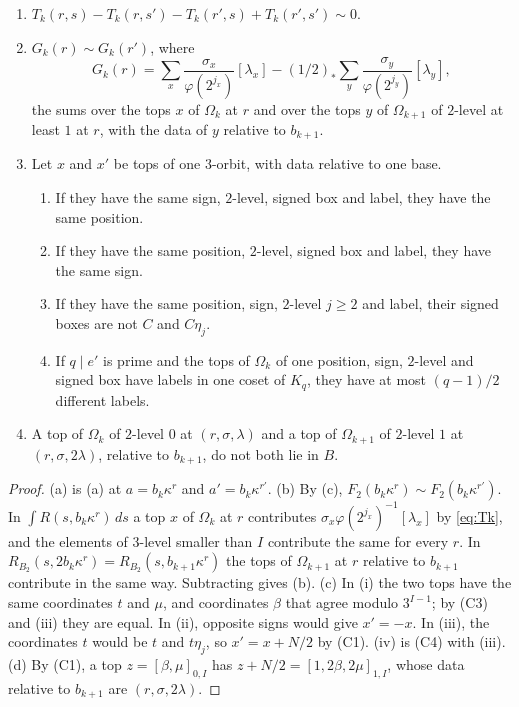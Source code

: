 \begin{lemma}\label{lem:threeorbit}
\begin{enumerate}[label=\textup{(\alph*)}]
\item $T_{k}(r,s)-T_{k}(r,s')-T_{k}(r',s)+T_{k}(r',s')\sim0$.
\item $G_{k}(r)\sim G_{k}(r')$, where
\[
  G_{k}(r)=\sum_{x}\frac{\sigma_{x}}{\varphi(2^{j_{x}})}[\lambda_{x}]
  -(1/2)_{*}\sum_{y}\frac{\sigma_{y}}{\varphi(2^{j_{y}})}[\lambda_{y}],
\]
the sums over the tops $x$ of $\Omega_{k}$ at $r$ and over the tops $y$ of
$\Omega_{k+1}$ of $2$-level at least $1$ at $r$, with the data of $y$
relative to $b_{k+1}$.
\item Let $x$ and $x'$ be tops of one $3$-orbit, with data relative to one
base.
\begin{enumerate}[label=\textup{(\roman*)}]
\item If they have the same sign, $2$-level, signed box and label, they have
the same position.
\item If they have the same position, $2$-level, signed box and label, they
have the same sign.
\item If they have the same position, sign, $2$-level $j\ge2$ and label, their
signed boxes are not $C$ and $C\eta_{j}$.
\item If $q\mid e'$ is prime and the tops of $\Omega_{k}$ of one position,
sign, $2$-level and signed box have labels in one coset of $K_{q}$, they have
at most $(q-1)/2$ different labels.
\end{enumerate}
\item A top of $\Omega_{k}$ of $2$-level $0$ at $(r,\sigma,\lambda)$ and a top
of $\Omega_{k+1}$ of $2$-level $1$ at $(r,\sigma,2\lambda)$, relative to
$b_{k+1}$, do not both lie in $B$.
\end{enumerate}
\end{lemma}

\begin{proof}
(a) is (a) at $a=b_{k}\kappa^{r}$ and $a'=b_{k}\kappa^{r'}$.
(b) By (c), $F_{2}(b_{k}\kappa^{r})\sim F_{2}(b_{k}
\kappa^{r'})$. In $\int R(s,b_{k}\kappa^{r})\,ds$ a top $x$ of $\Omega_{k}$
at $r$ contributes $\sigma_{x}\varphi(2^{j_{x}})^{-1}[\lambda_{x}]$ by
\eqref{eq:Tk}, and the elements of $3$-level smaller than $I$ contribute the
same for every $r$. In $R_{B_{2}}(s,2b_{k}\kappa^{r})=R_{B_{2}}(s,b_{k+1}
\kappa^{r})$ the tops of $\Omega_{k+1}$ at $r$ relative to $b_{k+1}$
contribute in the same way. Subtracting gives (b). (c) In (i) the two tops
have the same coordinates $t$ and $\mu$, and coordinates $\beta$ that agree
modulo $3^{I-1}$; by (C3) and (iii) they are equal. In
(ii), opposite signs would give $x'=-x$. In (iii), the coordinates $t$ would
be $t$ and $t\eta_{j}$, so $x'=x+N/2$ by (C1). (iv) is (C4) with
(iii). (d) By (C1), a top $z=[\beta,\mu]_{0,I}$ has
$z+N/2=[1,2\beta,2\mu]_{1,I}$, whose data relative to $b_{k+1}$ are
$(r,\sigma,2\lambda)$.
\end{proof}

